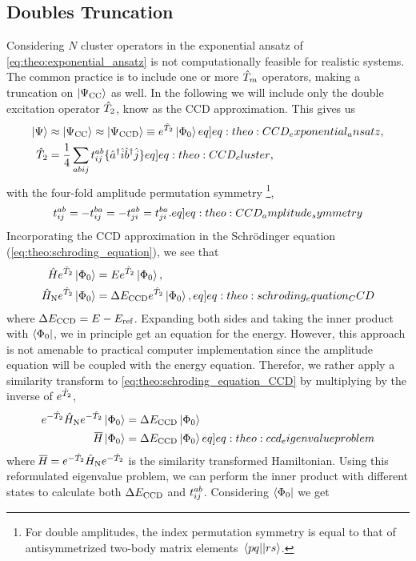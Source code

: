 \subsection{Doubles Truncation}
Considering $N$ cluster operators in the exponential ansatz of \cref{eq:theo:exponential_ansatz} is not computationally feasible for realistic systems. The common practice is to include one or more $\hat{T}_{m}$ operators, making a truncation on $\ket{\Psi_{\text{CC}}}$ as well. In the following we will include only the double excitation operator $\hat{T}_{2}$, know as the CCD approximation. This gives us 
\begin{align}
    \ket{\Psi} &\approx \ketCC \approx \ketCCD \equiv \exp{\cluster{2}} \ketansatz \label[eq]{eq:theo:CCD_exponential_ansatz}, \\
    \cluster{2} &= \frac{1}{4}\sum_{abij} \amplitude{ab}{ij}\set{ \crt{a} \ani{i} \crt{b}\ani{j}} \label[eq]{eq:theo:CCD_cluster},
\end{align}
with the four-fold amplitude permutation symmetry \footnote{For double amplitudes, the index permutation symmetry is equal to that of antisymmetrized two-body matrix elements $\mel{pq}{}{rs}$.},
\begin{align}
    \amplitude{ab}{ij} = - \amplitude{ba}{ij} = - \amplitude{ab}{ji} = \amplitude{ba}{ji}. \label[eq]{eq:theo:CCD_amplitude_symmetry}
\end{align}
Incorporating the CCD approximation in the Schr\"odinger equation (\cref{eq:theo:schroding_equation}), we see that
\begin{align}
    \ham \exp{\cluster{2}} \ketansatz &= E \exp{\cluster{2}} \nonumber \ketansatz,  \\
    \hamno \exp{\cluster{2}} \ketansatz &= \DECCD \exp{\cluster{2}} \ketansatz, \label[eq]{eq:theo:schroding_equation_CCD}
\end{align}
where $\Delta E_{\text{CCD}} = E-E_{\text{ref}}$. Expanding both sides and taking the inner product with $\bra{\Phi_0}$, we in principle get an equation for the energy. However, this approach is not amenable to practical computer implementation \citep{bartlettCoupledClusterMethodsMolecular1984} since the amplitude equation will be coupled with the energy equation. Therefor, we rather apply a similarity transform to \cref{eq:theo:schroding_equation_CCD} by multiplying by the inverse of $e^{\hat{T}_{2}}$,
\begin{align}
    \exp{-\cluster{2}} \hamno \exp{-\cluster{2}} \ketansatz &= \DECCD \ketansatz \nonumber \\
    \simham \ketansatz &= \DECCD \ketansatz \label[eq]{eq:theo:ccd_eigenvalueproblem}
\end{align}
where $\overline{\mkern-1.9mu H\mkern-0.9mu} = e^{-\hat{T}_{2}} \hat{H}_\text{N} e^{-\hat{T}_{2}}$ is the similarity transformed Hamiltonian. Using this reformulated eigenvalue problem, we can perform the inner product with different states to calculate both $\Delta E_{\text{CCD}}$ and $t^{ab}_{ij}$. Considering $\bra{\Phi_0}$ we get

